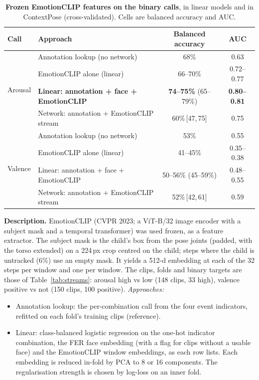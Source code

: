 \documentclass[11pt]{article}
\newcommand{\best}[1]{\textbf{#1}}
\newcommand{\ci}[2]{\,[#1,\,#2]}
\newcommand{\tabledesc}[1]{\par\medskip\begin{minipage}{\linewidth}\footnotesize\textbf{Description.} #1\end{minipage}}
\begin{document}
\begin{table}[!htbp]
\centering
\caption{\textbf{Frozen EmotionCLIP features on the binary calls}, in linear models and in ContextPose (cross-validated). Cells are balanced accuracy and AUC.}
\label{tab:eclip}
\begin{tabular}{llcc}
\toprule
Call & Approach & Balanced accuracy & AUC \\
\midrule
\multirow{4}{*}{Arousal}
 & Annotation lookup (no network) & 68\% & 0.63 \\
 & EmotionCLIP alone (linear) & 66--70\% & 0.72--0.77 \\
 & \best{Linear: annotation + face + EmotionCLIP} & \best{74--75\%} (65--79\%) & \best{0.80--0.81} \\
 & Network: annotation + EmotionCLIP stream & 60\%\ci{47}{75} & 0.75 \\
\midrule
\multirow{4}{*}{Valence}
 & Annotation lookup (no network) & 53\% & 0.55 \\
 & EmotionCLIP alone (linear) & 41--45\% & 0.35--0.38 \\
 & Linear: annotation + face + EmotionCLIP & 50--56\% (45--59\%) & 0.48--0.55 \\
 & Network: annotation + EmotionCLIP stream & 52\%\ci{42}{61} & 0.59 \\
\bottomrule
\end{tabular}
\tabledesc{EmotionCLIP (CVPR 2023; a ViT-B/32 image encoder with a subject mask and a temporal transformer) was used frozen, as a feature extractor. The subject mask is the child's box from the pose joints (padded, with the torso extended) on a 224\,px crop centred on the child; steps where the child is untracked (6\%) use an empty mask. It yields a 512-d embedding at each of the 32 steps per window and one per window. The clips, folds and binary targets are those of Table~\ref{tab:streams}: arousal high vs low (148 clips, 33 high), valence positive vs not (150 clips, 100 positive).
\emph{Approaches:}
\begin{itemize}
  \item Annotation lookup: the per-combination call from the four event indicators, refitted on each fold's training clips (reference).
  \item Linear: class-balanced logistic regression on the one-hot indicator combination, the FER face embedding (with a flag for clips without a usable face) and the EmotionCLIP window embeddings, as each row lists. Each embedding is reduced in-fold by PCA to 8 or 16 components. The regularisation strength is chosen by log-loss on an inner fold.

\end{itemize}}
\end{table}
\end{document}
